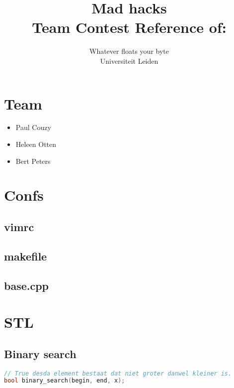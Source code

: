 \documentclass[10pt,hidelinks]{article}
\title{Mad hacks\\[1cm]
\small{Team Contest Reference of:}}
\author{Whatever floats your byte\\[1cm]
	\small{Universiteit Leiden}}
\begin{document}
\fontsize{10}{12}


\maketitle

\newpage

\tableofcontents

\section{Team}
\begin{itemize}
\item Paul Couzy
\item Heleen Otten
\item Bert Peters
\end{itemize}

\pagebreak

\section{Confs}

\subsection{vimrc}


\subsection{makefile}


\lstset{language=c++}

\subsection{base.cpp}


\pagebreak

\section{STL}

\subsection{Binary search}

\begin{lstlisting}[language=c++]
// True desda element bestaat dat niet groter danwel kleiner is.
bool binary_search(begin, end, x);
\end{lstlisting}
\end{document}
